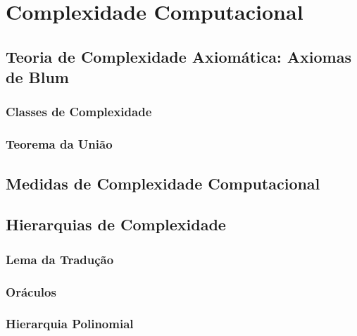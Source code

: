 \chapter{Complexidade Computacional}

\section{Teoria de Complexidade Axiomática: Axiomas de Blum}

\subsection{Classes de Complexidade}

\subsection{Teorema da União}

\section{Medidas de Complexidade Computacional}


\section{Hierarquias de Complexidade}

\subsection{Lema da Tradução}

\subsection{Oráculos}

\subsection{Hierarquia Polinomial}
